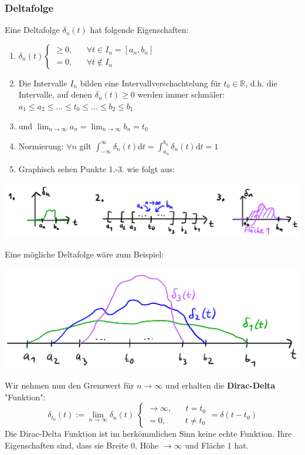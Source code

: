 \documentclass[11pt]{article}
\begin{document}
\subsubsection*{Deltafolge}
\vspace*{-0.5cm}
Eine Deltafolge $\delta_n(t)$ hat folgende Eigenschaften:
\vspace*{-0.5cm}
\begin{enumerate}
    \item $\delta_n(t) \begin{cases}
        \geq 0, \hspace{20pt} \forall t \in I_n = [a_n, b_n]\\
        = 0, \hspace{20pt} \forall t \notin I_n
    \end{cases}$
    \item Die Intervalle $I_n$ bilden eine Intervallverschachtelung für $t_0 \in \mathbb{R}$, d.h. die Intervalle, auf denen $\delta_n(t) \geq 0$ werden immer schmäler: $a_1 \leq a_2 \leq \dots \leq t_0 \leq \dots \leq b_2 \leq b_1$
    \item[] und $\displaystyle\lim_{n \to \infty}a_n = \displaystyle\lim_{n \to \infty}b_n = t_0$
    \item Normierung: $\forall n$ gilt $\displaystyle\int_{-\infty}^\infty \delta_n(t)\text{d}t = \displaystyle\int_{a_n}^{b_n}\delta_n(t)\text{d}t = 1$
    \item[] Graphisch sehen Punkte 1.-3. wie folgt aus:
\end{enumerate}
\begin{center}
    \includegraphics[width=0.9\linewidth]{docimgs/Deltafolge_1.jpg}
\end{center}

\vfill \null
\pagebreak

Eine mögliche Deltafolge wäre zum Beispiel:
\begin{center}
    \includegraphics[width=0.6\linewidth]{docimgs/Deltafolge_2.jpg}
\end{center}
Wir nehmen nun den Grenzwert für $n \to \infty$ und erhalten die \textbf{Dirac-Delta} "Funktion":
$$\delta_{t_0}(t) := \lim_{n \to \infty} \delta_n(t) \; \begin{cases}
    \to \infty, \hspace{20pt} t = t_0\\
    = 0, \hspace{28pt} t \neq t_0
\end{cases} = \delta(t-t_0)$$
Die Dirac-Delta Funktion ist im herkömmlichen Sinn keine echte Funktion. Ihre Eigenschaften sind, dass sie Breite $0$, Höhe $\to \infty$ und Fläche $1$ hat.
\end{document}
